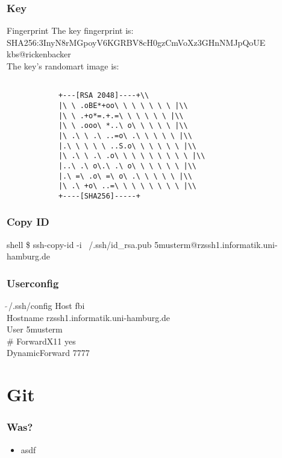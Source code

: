 \documentclass{beamer}
\begin{document}
    \begin{frame}
        \frametitle{Key}
        \begin{block}{Fingerprint}
            The key fingerprint is: \\
            SHA256:3InyN8rMGpoyV6KGRBV8cH0gzCmVoXz3GHnNMJpQoUE kbs@rickenbacker\\
            The key's randomart image is:\\
            \begin{verbatim}

            +---[RSA 2048]----+\\
            |\ \ .oBE*+oo\ \ \ \ \ \ \ |\\
            |\ \ .+o*=.+.=\ \ \ \ \ \ |\\
            |\ \ .ooo\ *..\ o\ \ \ \ \ |\\
            |\ .\ \ .\ ..=o\ .\ \ \ \ \ |\\
            |.\ \ \ \ \ ..S.o\ \ \ \ \ \ |\\
            |\ .\ \ .\ .o\ \ \ \ \ \ \ \ \ |\\
            |..\ .\ o\.\ .\ o\ \ \ \ \ \ |\\
            |.\ =\ .o\ =\ o\ .\ \ \ \ \ |\\
            |\ .\ +o\ ..=\ \ \ \ \ \ \ \ |\\
            +----[SHA256]-----+
        \end{verbatim}
        \end{block}
    \end{frame}
    \begin{frame}
        \frametitle{Copy ID}
        \begin{block}{shell}
            \small{\$ ssh-copy-id -i ~/.ssh/id\_rsa.pub 5musterm@rzssh1.informatik.uni-hamburg.de}

        \end{block}
    \end{frame}
    \begin{frame}
        \frametitle{Userconfig}
        \begin{block}{$\tilde \ $/.ssh/config}
            Host fbi\\
            \qquad Hostname rzssh1.informatik.uni-hamburg.de\\
            \qquad User 5musterm\\
            \qquad \# ForwardX11 yes\\
            \qquad DynamicForward 7777\\
        \end{block}
    \end{frame}
\section{Git}
\begin{frame}
    \frametitle{Was?}
    \begin{itemize}
        \item asdf
    \end{itemize}
\end{frame}
\end{document}
